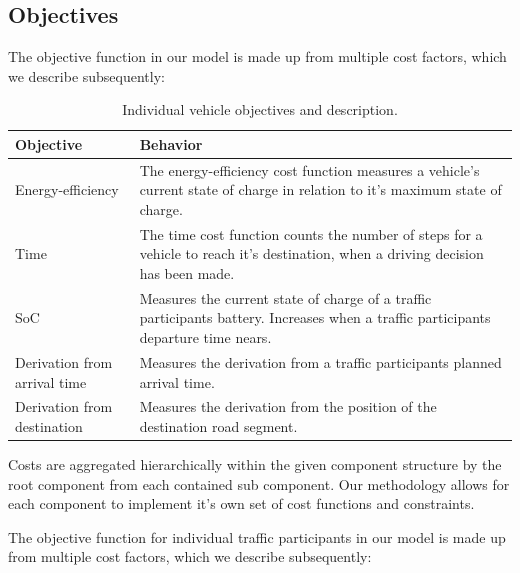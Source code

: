 \subsection{Objectives}
\label{objectives}

The objective function in our model is made up from multiple cost factors, which we describe subsequently:

\begin{table}[h!]
	\centering
	\renewcommand{\arraystretch}{1.3}
	\begin{tabularx}{\columnwidth}{|Y|Y|}
		\hline
		
		\textbf{Objective} & \textbf{Behavior} \\
		
		\hline
		
		Energy-efficiency &
		The energy-efficiency cost function measures a vehicle's current state of charge in relation to it's maximum state of charge. \\
		
		\hline
		
		Time &
		The time cost function counts the number of steps for a vehicle to reach it's destination, when a driving decision has been made. \\
		
		\hline
		
		SoC &
		Measures the current state of charge of a traffic participants battery. Increases when a traffic participants departure time nears. \\
		
		\hline
		
		Derivation from arrival time &
		Measures the derivation from a traffic participants planned arrival time. \\
		
		\hline
		
		Derivation from destination &
		Measures the derivation from the position of the destination road segment. \\
		
		\hline			
	\end{tabularx}
	\caption{Individual vehicle objectives and description.}
	\label{figure:objectives}
\end{table}

Costs are aggregated hierarchically within the given component structure by the root component from each contained sub component. Our methodology allows for each component to implement it's own set of cost functions and constraints. 


The objective function for individual traffic participants in our model is made up from multiple cost factors, which we describe subsequently:

